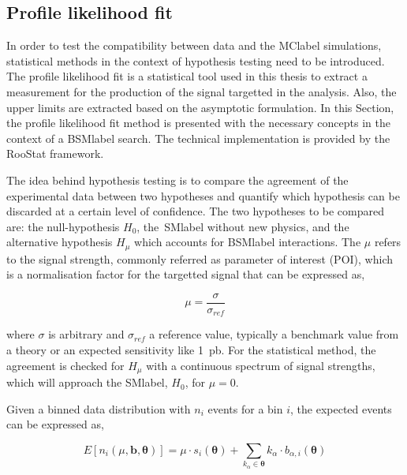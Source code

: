 \subsection{Profile likelihood fit}

In order to test the compatibility between data and the \acrshort{MClabel} simulations, statistical methods in the context of hypothesis testing need to be introduced. The profile likelihood fit is a statistical tool used in this thesis to extract a measurement for the production of the signal targetted in the analysis. Also, the upper limits are extracted based on the asymptotic formulation. In this Section, the profile likelihood fit method is presented with the necessary concepts in the context of a \acrshort{BSMlabel} search. %
The technical implementation is provided by the RooStat framework. %

The idea behind hypothesis testing is to compare the agreement of the experimental data between two hypotheses and quantify which hypothesis can be discarded at a certain level of confidence. The two hypotheses to be compared are: the null-hypothesis $H_0$, the~\acrshort{SMlabel} without new physics, and the alternative hypothesis $H_\mu$ which accounts for \acrshort{BSMlabel} interactions. The $\mu$ refers to the signal strength, commonly referred as parameter of interest (POI), which is a normalisation factor for the targetted signal that can be expressed as,

\begin{equation}
    \mu = \frac{\sigma}{\sigma_{ref}}
\end{equation}

where $\sigma$ is arbitrary and $\sigma_{ref}$ a reference value, typically a benchmark value from a theory or an expected sensitivity like 1~pb. For the statistical method, the agreement is checked for $H_\mu$ with a continuous spectrum of signal strengths, which will approach the \acrshort{SMlabel}, $H_0$, for $\mu=0$.

Given a binned data distribution with $n_i$ events for a bin $i$, the expected events can be expressed as,

\begin{equation}
    E[n_i(\mu,\mathbf{b},\mathbf{\theta})] = \mu\cdot s_i(\mathbf{\theta}) + \sum_{k_{\alpha}\in\mathbf{\theta}}k_\alpha\cdot b_{\alpha,i}(\mathbf{\theta})
\end{equation}

